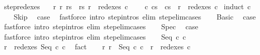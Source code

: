 \begin{isabellebody}
\isanewline
{}\isamarkupfalse%
\ step{\isacharunderscore}redexes{\isacharcolon}\isanewline
\ \ \ {\isachardoublequoteopen}{\isasymAnd}r\ r{\isacharprime}{\isachardot}\ {\isasymlbrakk}{\isasymGamma}{\isasymturnstile}{\isacharparenleft}r{\isacharcomma}s{\isacharparenright}\ {\isasymrightarrow}\ {\isacharparenleft}r{\isacharprime}{\isacharcomma}s{\isacharprime}{\isacharparenright}{\isacharsemicolon}\ r\ {\isasymin}\ redexes\ c{\isasymrbrakk}\ \isanewline
\ \ {\isasymLongrightarrow}\ {\isasymexists}c{\isacharprime}{\isachardot}\ {\isasymGamma}{\isasymturnstile}{\isacharparenleft}c{\isacharcomma}s{\isacharparenright}\ {\isasymrightarrow}\ {\isacharparenleft}c{\isacharprime}{\isacharcomma}s{\isacharprime}{\isacharparenright}\ {\isasymand}\ r{\isacharprime}\ {\isasymin}\ redexes\ c{\isacharprime}{\isachardoublequoteclose}\isanewline
%
\isadelimproof
%
\endisadelimproof
%
\isatagproof
{}\isamarkupfalse%
\ {\isacharparenleft}induct\ c{\isacharparenright}\isanewline
\ \ \isamarkupfalse%
\ Skip\ \isamarkupfalse%
\ {\isacharquery}case\ \isamarkupfalse%
\ {\isacharparenleft}fastforce\ intro{\isacharcolon}\ step{\isachardot}intros\ elim{\isacharcolon}\ step{\isacharunderscore}elim{\isacharunderscore}cases{\isacharparenright}\isanewline
{}\isamarkupfalse%
\isanewline
\ \ \isamarkupfalse%
\ Basic\ \isamarkupfalse%
\ {\isacharquery}case\ \isamarkupfalse%
\ {\isacharparenleft}fastforce\ intro{\isacharcolon}\ step{\isachardot}intros\ elim{\isacharcolon}\ step{\isacharunderscore}elim{\isacharunderscore}cases{\isacharparenright}\isanewline
{}\isamarkupfalse%
\isanewline
\ \ \isamarkupfalse%
\ Spec\ \isamarkupfalse%
\ {\isacharquery}case\ \isamarkupfalse%
\ {\isacharparenleft}fastforce\ intro{\isacharcolon}\ step{\isachardot}intros\ elim{\isacharcolon}\ step{\isacharunderscore}elim{\isacharunderscore}cases{\isacharparenright}\isanewline
{}\isamarkupfalse%
\isanewline
\ \ \isamarkupfalse%
\ {\isacharparenleft}Seq\ c\ c\isanewline
\ \ \isamarkupfalse%
\ {\isachardoublequoteopen}r\ {\isasymin}\ redexes\ {\isacharparenleft}Seq\ c\ c\ \isamarkupfalse%
\ fact\isanewline
\ \ \isamarkupfalse%
\ r{\isacharcolon}\ {\isachardoublequoteopen}r\ {\isacharequal}\ Seq\ c\ c\ {\isasymor}\ r\ {\isasymin}\ redexes\ c\isanewline

\end{isabellebody}
